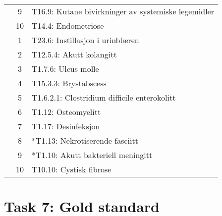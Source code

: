 \begin{table}[htbp]
\begin{tabular}{c c l}
	 & 9 & T16.9: Kutane bivirkninger av systemiske legemidler \\
	 & 10 & T14.4: Endometriose \\
	\addlinespace
	8 & 1 & T23.6: Instillasjon i urinblæren \\
	 & 2 & T12.5.4: Akutt kolangitt \\
	 & 3 & T1.7.6: Ulcus molle \\
	 & 4 & T15.3.3: Brystabscess \\
	 & 5 & T1.6.2.1: Clostridium difficile enterokolitt \\
	 & 6 & T1.12: Osteomyelitt \\
	 & 7 & T1.17: Desinfeksjon \\
	 & 8 & *T1.13: Nekrotiserende fasciitt \\
	 & 9 & *T1.10: Akutt bakteriell meningitt \\
	 & 10 & T10.10: Cystisk fibrose \\
	\bottomrule
\end{tabular}
\end{table}


\section{Task 7: Gold standard}


